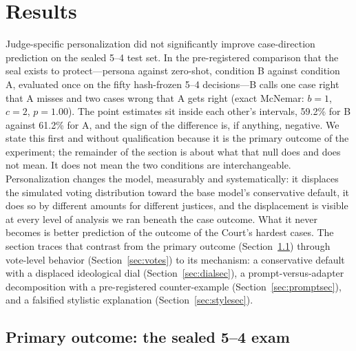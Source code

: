 \section{Results}\label{sec:results}

Judge-specific personalization did not significantly improve
case-direction prediction on the sealed 5--4 test set. In the
pre-registered comparison that the seal exists to protect---persona
against zero-shot, condition B against condition A, evaluated once on
the fifty hash-frozen 5--4 decisions---B calls one case right that A
misses and two cases wrong that A gets right (exact McNemar: $b=1$,
$c=2$, $p=1.00$). The point estimates sit inside each other's
intervals, 59.2\% for B against 61.2\% for A, and the sign of the
difference is, if anything, negative. We state this first and without
qualification because it is the primary outcome of the experiment; the
remainder of the section is about what that null does and does not
mean. It does not mean the two conditions are interchangeable.
Personalization changes the model, measurably and systematically: it
displaces the simulated voting distribution toward the base model's
conservative default, it does so by different amounts for different
justices, and the displacement is visible at every level of analysis
we ran beneath the case outcome. What it never becomes is better
prediction of the outcome of the Court's hardest cases. The section traces that contrast from the
primary outcome (Section~\ref{sec:primary}) through vote-level
behavior (Section~\ref{sec:votes}) to its mechanism: a conservative
default with a displaced ideological dial
(Section~\ref{sec:dialsec}), a prompt-versus-adapter decomposition
with a pre-registered counter-example
(Section~\ref{sec:promptsec}), and a falsified stylistic explanation
(Section~\ref{sec:stylesec}).

\subsection{Primary outcome: the sealed 5--4 exam}\label{sec:primary}

